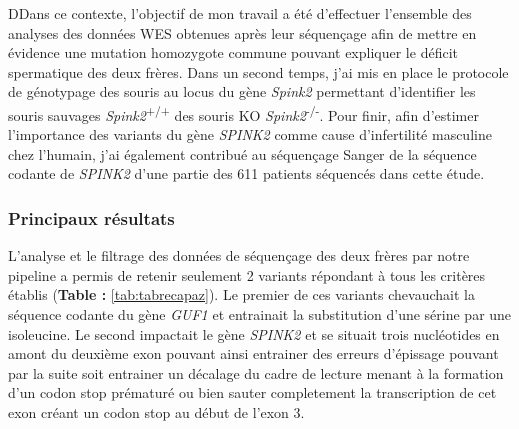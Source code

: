 \documentclass[12pt,twoside]{ugathesis}
\begin{document}
DDans ce contexte, l'objectif de mon travail a été d'effectuer
l'ensemble des analyses des données WES obtenues après leur séquençage
afin de mettre en évidence une mutation homozygote commune pouvant
expliquer le déficit spermatique des deux frères. Dans un second temps,
j'ai mis en place le protocole de génotypage des souris au locus du gène
\emph{Spink2} permettant d'identifier les souris sauvages
\emph{Spink2}\textsuperscript{+/+} des souris KO
\emph{Spink2}\textsuperscript{-/-}. Pour finir, afin d'estimer
l'importance des variants du gène \emph{SPINK2} comme cause
d'infertilité masculine chez l'humain, j'ai également contribué au
séquençage Sanger de la séquence codante de \emph{SPINK2} d'une partie
des 611 patients séquencés dans cette étude.

\newpage



\newpage

\subsubsection{Principaux résultats}\label{principaux-resultats}

L'analyse et le filtrage des données de séquençage des deux frères par
notre pipeline a permis de retenir seulement 2 variants répondant à tous
les critères établis (\textbf{Table : }\ref{tab:tabrecapaz}). Le premier
de ces variants chevauchait la séquence codante du gène \emph{GUF1} et
entrainait la substitution d'une sérine par une isoleucine. Le second
impactait le gène \emph{SPINK2} et se situait trois nucléotides en amont
du deuxième exon pouvant ainsi entrainer des erreurs d'épissage pouvant
par la suite soit entrainer un décalage du cadre de lecture menant à la
formation d'un codon stop prématuré ou bien sauter completement la
transcription de cet exon créant un codon stop au début de l'exon 3.
\end{document}
